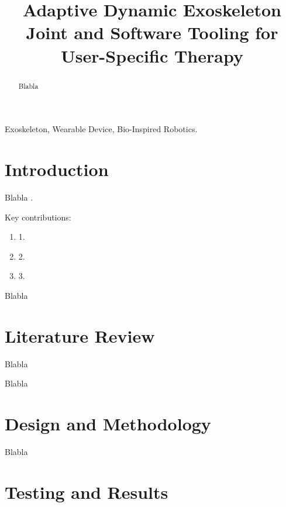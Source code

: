 \documentclass[conference]{IEEEtran}
\begin{document}
\title{Adaptive Dynamic Exoskeleton Joint and Software Tooling for User-Specific Therapy}

\author{
}


\maketitle
\begin{abstract}

Blabla

\end{abstract}

\begin{IEEEkeywords}

Exoskeleton, Wearable Device, Bio-Inspired Robotics.

\end{IEEEkeywords}

\section{Introduction}

Blabla \parencite{HRR93}.

Key contributions:
\begin{enumerate}
\item 1.
\item 2.
\item 3.
\end{enumerate}

Blabla

\section{Literature Review}

Blabla

Blabla

\section{Design and Methodology}

Blabla

\section{Testing and Results}
\end{document}
